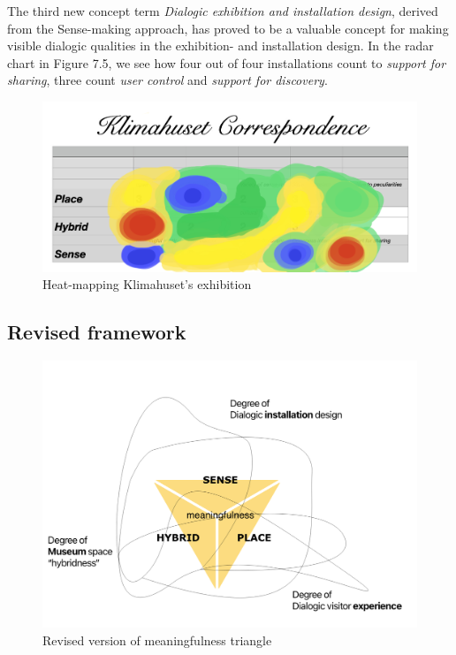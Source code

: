 The third new concept term \textit{Dialogic exhibition and installation design}, derived from the Sense-making approach, has proved to be a valuable concept for making visible dialogic qualities in the exhibition- and installation design. In the radar chart in Figure 7.5, we see how four out of four installations count to \emph{support for sharing}, three count \emph{user control} and \textit{support for discovery}.


\begin{figure}[H]
\centering 
\includegraphics[width=13cm]{pictures/analysis/klimahuset_heat.png}
\caption{Heat-mapping Klimahuset's exhibition}
\end{figure}


\subsection{Revised framework}


\begin{figure}[H]
\centering 
\includegraphics[width=13cm]{pictures/analysis/triangle_revised.png}
\caption{Revised version of meaningfulness triangle}
\end{figure}

